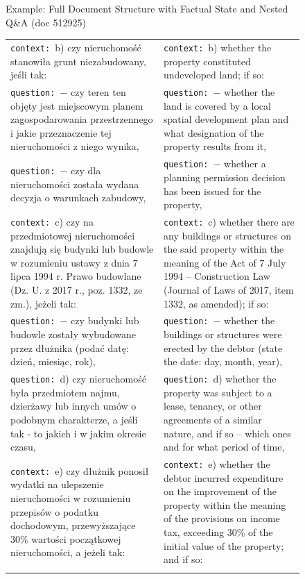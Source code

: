 \begin{figure}[!htb]
\begin{examplebox}{Example: Full Document Structure with Factual State and Nested Q\&A (doc 512925)}
\begin{tabularx}{\linewidth}{@{}>{\raggedright\arraybackslash}X@{\hspace{1em}}>{\raggedright\arraybackslash}X@{}}
\texttt{context:}~b) czy nieruchomość stanowiła grunt niezabudowany, jeśli tak: &
\texttt{context:}~b) whether the property constituted undeveloped land; if so: \\
\addlinespace

\hspace{1em} \texttt{question:}~$-$ czy teren ten objęty jest miejscowym planem zagospodarowania przestrzennego i jakie przeznaczenie tej nieruchomości z niego wynika, &
\hspace{1em} \texttt{question:}~$-$ whether the land is covered by a local spatial development plan and what designation of the property results from it, \\
\addlinespace

\hspace{1em} \texttt{question:}~$-$ czy dla nieruchomości została wydana decyzja o warunkach zabudowy, &
\hspace{1em} \texttt{question:}~$-$ whether a planning permission decision has been issued for the property, \\
\addlinespace

\texttt{context:}~c) czy na przedmiotowej nieruchomości znajdują się budynki lub budowle w rozumieniu ustawy z dnia 7 lipca 1994 r. Prawo budowlane (Dz. U. z 2017 r., poz. 1332, ze zm.), jeżeli tak: &
\texttt{context:}~c) whether there are any buildings or structures on the said property within the meaning of the Act of 7 July 1994 -- Construction Law (Journal of Laws of 2017, item 1332, as amended); if so: \\
\addlinespace

\hspace{1em} \texttt{question:}~$-$ czy budynki lub budowle zostały wybudowane przez dłużnika (podać datę: dzień, miesiąc, rok), &
\hspace{1em} \texttt{question:}~$-$ whether the buildings or structures were erected by the debtor (state the date: day, month, year), \\
\addlinespace

\texttt{question:}~d) czy nieruchomość była przedmiotem najmu, dzierżawy lub innych umów o podobnym charakterze, a jeśli tak - to jakich i w jakim okresie czasu, &
\texttt{question:}~d) whether the property was subject to a lease, tenancy, or other agreements of a similar nature, and if so -- which ones and for what period of time, \\
\addlinespace

\texttt{context:}~e) czy dłużnik ponosił wydatki na ulepszenie nieruchomości w rozumieniu przepisów o podatku dochodowym, przewyższające 30\% wartości początkowej nieruchomości, a jeżeli tak: &
\texttt{context:}~e) whether the debtor incurred expenditure on the improvement of the property within the meaning of the provisions on income tax, exceeding 30\% of the initial value of the property; and if so: \\
\addlinespace


\end{tabularx}
\end{examplebox}
\end{figure}
